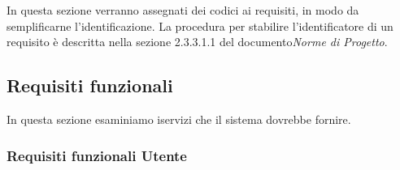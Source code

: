 \documentclass[../analisi-dei-requisiti]{subfiles}
\begin{document}
In questa sezione verranno assegnati dei codici ai requisiti, in modo da semplificarne l’identificazione. La procedura per stabilire l'identificatore di un requisito è descritta nella sezione 2.3.3.1.1 del documento\textit{Norme di Progetto}.

\subsection{Requisiti funzionali}
\label{sub:requisiti_funzionali}
In questa sezione esaminiamo iservizi che il sistema dovrebbe fornire.

\subsubsection{Requisiti funzionali Utente}
\label{subsub:requisiti_funzionali_utente}
\end{document}

